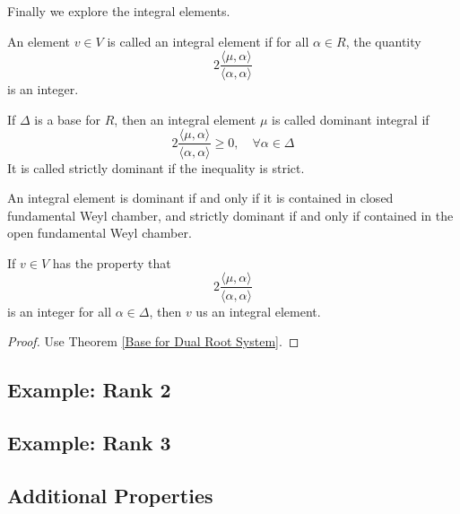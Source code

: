 Finally we explore the integral elements.
\begin{definition}
    An element $v\in V$ is called an integral element if for all $\alpha\in R$, the quantity 
    \[2\frac{\langle\mu,\alpha\rangle}{\langle\alpha,\alpha\rangle}\] 
    is an integer.
\end{definition}
\begin{definition}
    If $\Delta$ is a base for $R$, then an integral element $\mu$ is called dominant integral if 
    \[ 2\frac{\langle\mu,\alpha\rangle}{\langle\alpha,\alpha\rangle}\geq 0,\quad\forall \alpha\in\Delta\] 
    It is called strictly dominant if the inequality is strict.
\end{definition}
\begin{remark}
    An integral element is dominant if and only if it is contained in closed fundamental Weyl chamber,
    and strictly dominant if and only if contained in the open fundamental Weyl chamber.
\end{remark}
\begin{lemma}
    If $v\in V$ has the property that \[2\frac{\langle\mu,\alpha\rangle}{\langle\alpha,\alpha\rangle}\] 
    is an integer for all $\alpha\in \Delta$, then $v$ us an integral element.
\end{lemma}
\begin{proof}
    Use Theorem \ref{Base for Dual Root System}.
\end{proof}

\begin{definition}
    
\end{definition}


\begin{definition}
    
\end{definition}
\subsection{Example: Rank 2}





\subsection{Example: Rank 3}





\subsection{Additional Properties}




